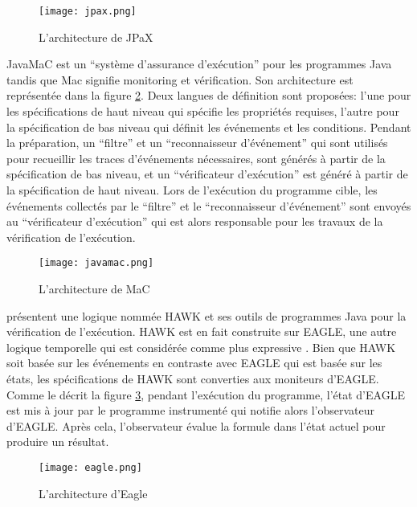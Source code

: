 \begin{figure}[h]
\begin{center}
\centering
\texttt{[image: jpax.png]}
\caption{L'architecture de JPaX \citep{havelund2001java}}
\label{img:jpax}
\end{center}
\end{figure}

JavaMaC \citep{kim2004java} est un ``système d'assurance d'exécution'' pour les programmes Java tandis que Mac signifie monitoring et vérification. Son architecture est représentée dans la figure \ref{img:javamac}. Deux langues de définition sont proposées: l'une pour les spécifications de haut niveau qui spécifie les propriétés requises, l'autre pour la spécification de bas niveau qui définit les événements et les conditions. Pendant la préparation, un ``filtre'' et un ``reconnaisseur d'événement'' qui sont utilisés pour recueillir les traces d'événements nécessaires, sont générés à partir de la spécification de bas niveau, et un ``vérificateur d'exécution'' est généré à partir de la spécification de haut niveau. Lors de l'exécution du programme cible, les événements collectés par le ``filtre'' et le ``reconnaisseur d'événement'' sont envoyés au ``vérificateur d'exécution'' qui est alors responsable pour les travaux de la vérification de l'exécution.

\begin{figure}[h]
\begin{center}
\centering
\texttt{[image: javamac.png]}
\caption{L'architecture de MaC \citep{kim2004java}}
\label{img:javamac}
\end{center}
\end{figure}

\cite{d2005event} présentent une logique nommée HAWK et ses outils de programmes Java pour la vérification de l'exécution. HAWK est en fait construite sur EAGLE, une autre logique temporelle qui est considérée comme plus expressive \citep{barringer2004rule}. Bien que HAWK soit basée sur les événements en contraste avec EAGLE qui est basée sur les états, les spécifications de HAWK sont converties aux moniteurs d'EAGLE. Comme le décrit la figure \ref{img:eagle}, pendant l'exécution du programme, l'état d'EAGLE est mis à jour par le programme instrumenté qui notifie alors l'observateur d'EAGLE. Après cela, l'observateur évalue la formule dans l'état actuel pour produire un résultat.

\begin{figure}[h]
\begin{center}
\centering
\texttt{[image: eagle.png]}
\caption{L'architecture d'Eagle \citep{d2005event}}
\label{img:eagle}
\end{center}
\end{figure}

